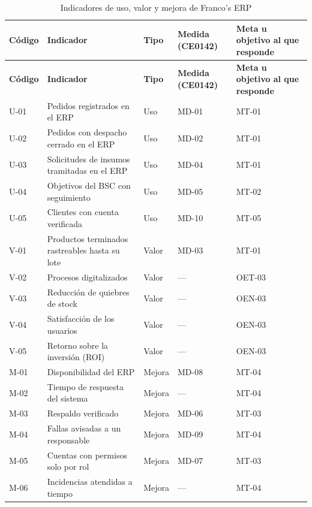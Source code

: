 {\small
\renewcommand{\arraystretch}{1.3}
\begin{longtable}{|>{\raggedright\arraybackslash}p{0.84cm}|>{\raggedright\arraybackslash}p{6.46cm}|>{\raggedright\arraybackslash}p{0.84cm}|>{\raggedright\arraybackslash}p{2.11cm}|>{\raggedright\arraybackslash}p{4.35cm}|}
\caption{Indicadores de uso, valor y mejora de Franco's ERP}\label{tab:cap5-1}\\
\hline
\textbf{Código} & \textbf{Indicador} & \textbf{Tipo} & \textbf{Medida (CE0142)} & \textbf{Meta u objetivo al que responde} \\
\hline
\endfirsthead
\hline
\textbf{Código} & \textbf{Indicador} & \textbf{Tipo} & \textbf{Medida (CE0142)} & \textbf{Meta u objetivo al que responde} \\
\hline
\endhead
U-01 & Pedidos registrados en el ERP & Uso & MD-01 & MT-01 \\
\hline
U-02 & Pedidos con despacho cerrado en el ERP & Uso & MD-02 & MT-01 \\
\hline
U-03 & Solicitudes de insumos tramitadas en el ERP & Uso & MD-04 & MT-01 \\
\hline
U-04 & Objetivos del BSC con seguimiento & Uso & MD-05 & MT-02 \\
\hline
U-05 & Clientes con cuenta verificada & Uso & MD-10 & MT-05 \\
\hline
V-01 & Productos terminados rastreables hasta su lote & Valor & MD-03 & MT-01 \\
\hline
V-02 & Procesos digitalizados & Valor & — & OET-03 \\
\hline
V-03 & Reducción de quiebres de stock & Valor & — & OEN-03 \\
\hline
V-04 & Satisfacción de los usuarios & Valor & — & OEN-03 \\
\hline
V-05 & Retorno sobre la inversión (ROI) & Valor & — & OEN-03 \\
\hline
M-01 & Disponibilidad del ERP & Mejora & MD-08 & MT-04 \\
\hline
M-02 & Tiempo de respuesta del sistema & Mejora & — & MT-04 \\
\hline
M-03 & Respaldo verificado & Mejora & MD-06 & MT-03 \\
\hline
M-04 & Fallas avisadas a un responsable & Mejora & MD-09 & MT-04 \\
\hline
M-05 & Cuentas con permisos solo por rol & Mejora & MD-07 & MT-03 \\
\hline
M-06 & Incidencias atendidas a tiempo & Mejora & — & MT-04 \\
\hline
\end{longtable}
}


